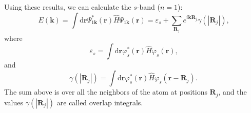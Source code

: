 \documentclass[11pt, a4paper, twocolumn]{article}
\newcommand{\bb}[1]{\mathbf{#1}}
\newcommand{\dd}{\mathrm{d}}
\begin{document}
\par Using these results, we can calculate the $s$-band ($n=1$):
\begin{equation*}
  E(\bb k) = \int\dd\bb r \Psi_{1\bb k}^{*}(\bb r) \hat H \Psi_{1\bb k}(\bb r) = 
  \varepsilon_s + \sum\limits_{\bb R_j}e^{i\bb k \bb R_j}\gamma(|\bb R_j|) \textrm{,}
\end{equation*} 
where 
\begin{equation*}
  \varepsilon_s = \int\dd\bb r \varphi_{s}^{*}(\bb r) \hat H \varphi_{s}(\bb r) \textrm{,}
\end{equation*}
and 
\begin{equation*}
  \gamma(|\bb R_j|) = \int\dd \bb r \varphi_s^{*}(\bb r)\hat H\varphi_s(\bb r - \bb R_j) \textrm{.}
\end{equation*}
The sum above is over all the neighbors of the atom at positions $\bb R_j$, and 
the values $\gamma (|\bb R_j|)$ are called overlap integrals.

\end{document}
